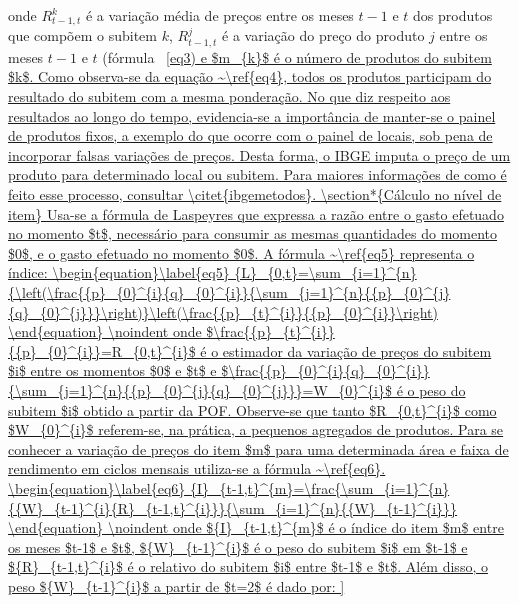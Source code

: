 \documentclass[twoside,a4paper,12pt]{report}
\begin{document}
\noindent onde ${R}_{t-1,t}^{k}$ é a variação média de preços entre os meses $t-1$ e $t$ dos produtos que compõem o subitem $k$, ${R}_{t-1,t}^{j}$ é a variação do preço do produto $j$ entre os meses $t-1$ e $t$ (fórmula ~\ref{eq3) e $m_{k}$ é o número de produtos do subitem $k$. Como observa-se da equação ~\ref{eq4}, todos os produtos participam do resultado do subitem com a mesma ponderação.

No que diz respeito aos resultados ao longo do tempo, evidencia-se a importância de manter-se o painel de produtos fixos, a exemplo do que ocorre com o painel de locais, sob pena de incorporar falsas variações de preços. Desta forma, o IBGE imputa o preço de um produto para determinado local ou subitem. Para maiores informações de como é feito esse processo, consultar \citet{ibgemetodos}.

\section*{Cálculo no nível de item}

Usa-se a fórmula de Laspeyres que expressa a razão entre o gasto efetuado no momento $t$, necessário para consumir as mesmas quantidades do momento $0$, e o gasto efetuado no momento $0$. A fórmula ~\ref{eq5} representa o índice:

\begin{equation}\label{eq5}
{L}_{0,t}=\sum_{i=1}^{n}{\left(\frac{{p}_{0}^{i}{q}_{0}^{i}}{\sum_{j=1}^{n}{{p}_{0}^{j}{q}_{0}^{j}}}\right)}\left(\frac{{p}_{t}^{i}}{{p}_{0}^{i}}\right) 
\end{equation}

\noindent onde $\frac{{p}_{t}^{i}}{{p}_{0}^{i}}=R_{0,t}^{i}$ é o estimador da variação de preços do subitem $i$ entre os momentos $0$ e $t$ e $\frac{{p}_{0}^{i}{q}_{0}^{i}}{\sum_{j=1}^{n}{{p}_{0}^{j}{q}_{0}^{j}}}=W_{0}^{i}$ é o peso do subitem $i$ obtido a partir da POF. Observe-se que tanto $R_{0,t}^{i}$ como $W_{0}^{i}$ referem-se, na prática, a pequenos agregados de produtos. Para se conhecer a variação de preços do item $m$ para uma determinada área e faixa de rendimento em ciclos mensais utiliza-se a fórmula ~\ref{eq6}.

\begin{equation}\label{eq6}
{I}_{t-1,t}^{m}=\frac{\sum_{i=1}^{n}{{W}_{t-1}^{i}{R}_{t-1,t}^{i}}}{\sum_{i=1}^{n}{{W}_{t-1}^{i}}} 
\end{equation}

\noindent onde ${I}_{t-1,t}^{m}$ é o índice do item $m$ entre os meses $t-1$ e $t$, ${W}_{t-1}^{i}$ é o peso do subitem $i$ em $t-1$ e ${R}_{t-1,t}^{i}$ é o relativo do subitem $i$ entre $t-1$ e $t$. Além disso, o peso ${W}_{t-1}^{i}$ a partir de $t=2$ é dado por:

}
\end{document}
